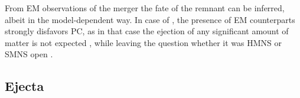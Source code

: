 From \ac{EM} observations of the merger the fate of the remnant can be inferred, 
albeit in the model-dependent way. In case of \GW{}, the presence of \ac{EM} counterparts 
strongly disfavors \ac{PC}, as in that case the ejection of any significant amount 
of matter is not expected \citep{Margalit:2017dij,Bauswein:2017vtn,Radice:2017lry}, 
while leaving the question whether it was \ac{HMNS} or \ac{SMNS} open
\citep{Margalit:2017dij,Ai:2018jtv}. 
%
%
%



\subsection{Ejecta}\label{sec:intro:ejecta}

%

